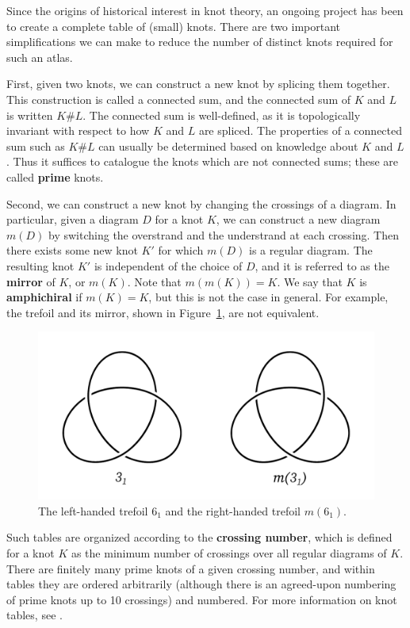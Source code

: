 Since the origins of historical interest in knot theory, an ongoing project has been to create a complete table of (small) knots. There are two important simplifications we can make to reduce the number of distinct knots required for such an atlas.

First, given two knots, we can construct a new knot by splicing them together. This construction is called a connected sum, and the connected sum of $K$ and $L$ is written $K \# L$. The connected sum is well-defined, as it is topologically invariant with respect to how $K$ and $L$ are spliced.
The properties of a connected sum such as $K \# L$ can usually be determined based on knowledge about $K$ and $L$. Thus it suffices to catalogue the knots which are not connected sums; these are called \textbf{prime} knots.

Second, we can construct a new knot by changing the crossings of a diagram. In particular, given a diagram $D$ for a knot $K$, we can construct a new diagram $m(D)$ by switching the overstrand and the understrand at each crossing. Then there exists some new knot $K'$ for which $m(D)$ is a regular diagram. The resulting knot $K'$ is independent of the choice of $D$, and it is referred to as the \textbf{mirror} of $K$, or $m(K)$. Note that $m(m(K)) = K$. We say that $K$ is \textbf{amphichiral} if $m(K) = K$, but this is not the case in general. For example, the trefoil and its mirror, shown in Figure~\ref{fig:mirror}, are not equivalent.

\begin{figure}[ht]
    \centering
    \includegraphics[width=0.5\linewidth]{images/mirror.pdf}
    \caption{The left-handed trefoil $6_1$ and the right-handed trefoil $m(6_1)$.}%
    \label{fig:mirror}
\end{figure}

Such tables are organized according to the \textbf{crossing number}, which is defined for a knot $K$ as the minimum number of crossings over all regular diagrams of $K$.
There are finitely many prime knots of a given crossing number, and within tables they are ordered arbitrarily (although there is an agreed-upon numbering of prime knots up to 10 crossings) and numbered. For more information on knot tables, see \cite{hoste}.


